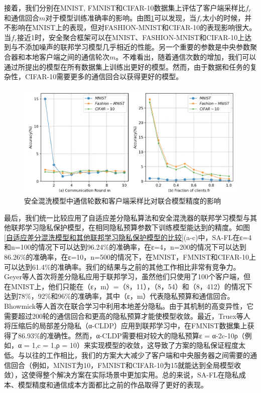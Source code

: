 接着，我们分别在MNIST, FMNIST和CIFAR-10数据集上评估了客户端采样比$f_{r}$和通信回合$m$对于模型训练准确率的影响。由图\ref{fig:安全混洗模型中通信轮数和客户端采样比对联合模型精度的影响}可以发现，当$f_{r}$太小的时候，并不影响在MNIST上的表现，但对FASHION-MNIST和CIFAR-10的表现影响很大。当$f_{r}$接近1时，安全聚合框架可以在MNIST、FASHION-MNIST和CIFAR-10上达到与不添加噪声的联邦学习模型几乎相近的性能。另一个重要的参数是中央参数聚合器和本地客户端之间的通信轮次$m$。不难看出，随着通信次数的增加，我们可以通过所提出的模型在所有数据集上训练出更好的模型。然而，由于数据和任务的复杂性，CIFAR-10需要更多的通信回合以获得更好的模型。

\begin{figure}[!hbt]
\centering
  	\includegraphics[scale=0.4]{fig2/C4/SA-FL2}%
	\caption{安全混洗模型中通信轮数和客户端采样比对联合模型精度的影响}
  	\label{fig:安全混洗模型中通信轮数和客户端采样比对联合模型精度的影响} 
\end{figure}

最后，我们统一比较应用了自适应差分隐私算法和安全混洗器的联邦学习模型与其他联邦学习隐私保护模型，在相同隐私预算参数下训练模型能达到的精度。如图\ref{自适应差分混洗模型和其他联邦学习隐私保护模型的比较}(a-c)中，SA-FL在ε=4和n=100的情况下可以达到96.24$\%$的准确率，在ε=4，n=200的情况下可以达到86.26$\%$的准确率，在ε=10，n=500的情况下，在MNIST，FMNIST和CIFAR-10上可以达到61.4$\%$的准确率。我们的结果与之前的其他工作相比非常有竞争力。Geyer等人首次将差分隐私应用于联邦学习，虽然他们只使用了100个客户端，但在MNIST上，他们只能在（ε，m）=（8，11），（8，54）和（8，412）的情况下达到78$\%$，92$\%$和96$\%$的准确率，其中（ε，m）代表隐私预算和通信回合。Bhowmick等人首次在联合学习中利用本地差分隐私。由于其机制的高变异性，它需要超过200轮的通信回合和更高的隐私预算才能使模型收敛。最近，Truex等人将压缩后的局部差分隐私（α-CLDP）应用到联邦学习中，在FMNIST数据集上获得了86.93$\%$的准确性。然而，α-CLDP需要相对较大的隐私预算ε = α-2c-10ρ（例如，α = 1,c = 1,ρ = 10）来实现模型的收敛，这导致了方案的隐私保证程度太低。与以往的工作相比，我们的方案大大减少了客户端和中央服务器之间需要的通信回合（例如，MNIST为10，FMNIST和CIFAR-10为15就能达到全局模型收敛），这使得整个解决方案在实际场景中更加实用。总的来说，SA-FL在隐私成本、模型精度和通信成本方面都比之前的作品取得了更好的表现。

